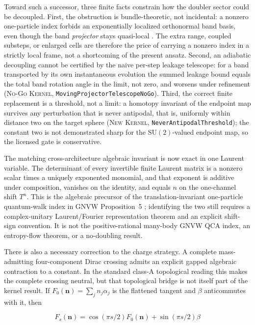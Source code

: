 \documentclass[11pt]{article}
\newcommand{\Kernel}{\textcolor{kernelcolor}{\textsc{Kernel}}}
\newcommand{\NewResult}{\textsc{New}}
\newcommand{\NoGo}{\textsc{No-Go}}
\begin{document}
Toward such a successor, three finite facts constrain how the doubler sector could be
decoupled.  First, the obstruction is bundle-theoretic, not incidental: a nonzero
one-particle index forbids an exponentially localized orthonormal band basis, even though
the band \emph{projector} stays quasi-local
\cite{ReadLaurentKTheory,GNVW}.  The extra range, coupled substeps, or enlarged cells are
therefore the price of carrying a nonzero index in a strictly local frame, not a
shortcoming of the present ansatz.  Second, an adiabatic decoupling cannot be certified by
the naive per-step leakage telescope: for a band transported by its own instantaneous
evolution the summed leakage bound equals the total band rotation angle in the limit, not
zero, and worsens under refinement (\NoGo{} \Kernel{},
\texttt{MovingProjectorTelescopeNoGo}).  Third, the correct finite replacement is a
threshold, not a limit: a homotopy invariant of the endpoint map survives any perturbation
that is never antipodal, that is, uniformly within distance two on the target sphere
(\NewResult{} \Kernel{}, \texttt{NeverAntipodalThreshold}); the constant two is not
demonstrated sharp for the $\mathrm{SU}(2)$-valued endpoint map, so the licensed gate is
conservative.

The matching cross-architecture algebraic invariant is now exact in one
Laurent variable.  The determinant of every invertible finite Laurent matrix
is a nonzero scalar times a uniquely exponented monomial, and that exponent is
additive under composition, vanishes on the identity, and equals $n$ on the
one-channel shift $T^n$.  This is the algebraic precursor of the
translation-invariant one-particle quantum-walk index in GNVW Proposition~5
\cite{GNVW}; identifying the two still requires a complex-unitary
Laurent/Fourier representation theorem and an explicit shift-sign convention.
It is not the positive-rational many-body GNVW QCA index, an entropy-flow
theorem, or a no-doubling result.

There is also a necessary correction to the charge strategy.  A complete
mass-admitting four-component Dirac crossing admits an explicit gapped
algebraic contraction to a constant.  In the standard class-A topological
reading this makes the complete crossing neutral, but that topological bridge
is not itself part of the kernel result.  If
$F_0(\mathbf n)=\sum_j n_j\alpha_j$ is the flattened tangent and $\beta$
anticommutes with it, then

\begin{equation}
 F_s(\mathbf n)=\cos(\pi s/2)F_0(\mathbf n)+\sin(\pi s/2)\beta
\end{equation}
\end{document}

